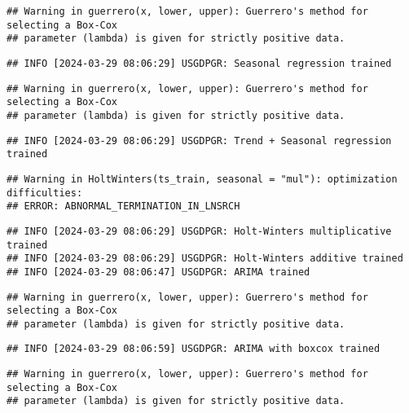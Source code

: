 \documentclass[
]{article}
\begin{document}
\begin{verbatim}
## Warning in guerrero(x, lower, upper): Guerrero's method for selecting a Box-Cox
## parameter (lambda) is given for strictly positive data.
\end{verbatim}

\begin{verbatim}
## INFO [2024-03-29 08:06:29] USGDPGR: Seasonal regression trained
\end{verbatim}

\begin{verbatim}
## Warning in guerrero(x, lower, upper): Guerrero's method for selecting a Box-Cox
## parameter (lambda) is given for strictly positive data.
\end{verbatim}

\begin{verbatim}
## INFO [2024-03-29 08:06:29] USGDPGR: Trend + Seasonal regression trained
\end{verbatim}

\begin{verbatim}
## Warning in HoltWinters(ts_train, seasonal = "mul"): optimization difficulties:
## ERROR: ABNORMAL_TERMINATION_IN_LNSRCH
\end{verbatim}

\begin{verbatim}
## INFO [2024-03-29 08:06:29] USGDPGR: Holt-Winters multiplicative trained
## INFO [2024-03-29 08:06:29] USGDPGR: Holt-Winters additive trained
## INFO [2024-03-29 08:06:47] USGDPGR: ARIMA trained
\end{verbatim}

\begin{verbatim}
## Warning in guerrero(x, lower, upper): Guerrero's method for selecting a Box-Cox
## parameter (lambda) is given for strictly positive data.
\end{verbatim}

\begin{verbatim}
## INFO [2024-03-29 08:06:59] USGDPGR: ARIMA with boxcox trained
\end{verbatim}

\begin{verbatim}
## Warning in guerrero(x, lower, upper): Guerrero's method for selecting a Box-Cox
## parameter (lambda) is given for strictly positive data.
\end{verbatim}
\end{document}
